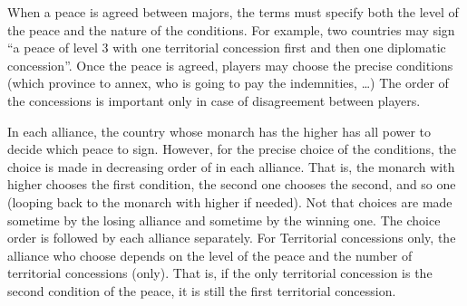 When a peace is agreed between majors, the terms must specify both the level
of the peace and the nature of the conditions. For example, two countries may
sign ``a peace of level 3 with one territorial concession first and then one
diplomatic concession''.
\bparag Once the peace is agreed, players may choose the precise conditions
(which province to annex, who is going to pay the indemnities, \ldots)
\bparag The order of the concessions is important only in case of disagreement
between players.

\aparag[Disagreement] In each alliance, the country whose monarch has the
higher \DIP has all power to decide which peace to sign.
\bparag However, for the precise choice of the conditions, the choice is made
in decreasing order of \DIP in each alliance. That is, the monarch with higher
\DIP chooses the first condition, the second one chooses the second, and so
one (looping back to the monarch with higher \DIP if needed).
\bparag Not that choices are made sometime by the losing alliance and sometime
by the winning one. The choice order is followed by each alliance separately.
\bparag For Territorial concessions only, the alliance who choose depends on
the level of the peace and the number of territorial concessions (only). That
is, if the only territorial concession is the second condition of the peace,
it is still the first territorial concession.

